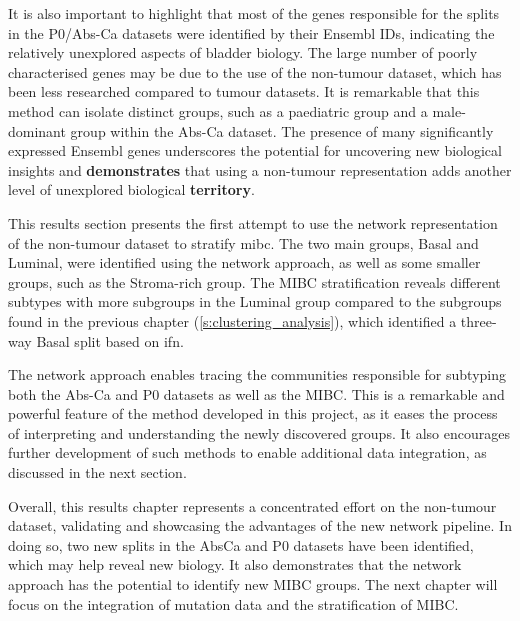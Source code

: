 It is also important to highlight that most of the genes responsible for the splits in the P0/Abs-Ca datasets were identified by their Ensembl IDs, indicating the relatively unexplored aspects of bladder biology. The large number of poorly characterised genes may be due to the use of the non-tumour dataset, which has been less researched compared to tumour datasets. It is remarkable that this method can isolate distinct groups, such as a paediatric group and a male-dominant group within the Abs-Ca dataset. The presence of many significantly expressed Ensembl genes underscores the potential for uncovering new biological insights and \textbf{demonstrates} that using a non-tumour representation adds another level of unexplored biological \textbf{territory}.




This results section presents the first attempt to use the network representation of the non-tumour dataset to stratify \acrlong{mibc}. The two main groups, Basal and Luminal, were identified using the network approach, as well as some smaller groups, such as the Stroma-rich group. The MIBC stratification reveals different subtypes with more subgroups in the Luminal group compared to the subgroups found in the previous chapter (\cref{s:clustering_analysis}), which identified a three-way Basal split based on \acrlong{ifn}.

The network approach enables tracing the communities responsible for subtyping both the Abs-Ca and P0 datasets as well as the MIBC. This is a remarkable and powerful feature of the method developed in this project, as it eases the process of interpreting and understanding the newly discovered groups. It also encourages further development of such methods to enable additional data integration, as discussed in the next section.

Overall, this results chapter represents a concentrated effort on the non-tumour dataset, validating and showcasing the advantages of the new network pipeline. In doing so, two new splits in the AbsCa and P0 datasets have been identified, which may help reveal new biology. It also demonstrates that the network approach has the potential to identify new MIBC groups. The next chapter will focus on the integration of mutation data and the stratification of MIBC.

